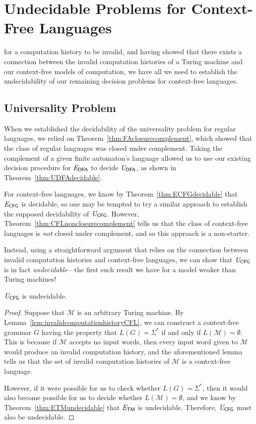 \section{Undecidable Problems for Context-Free Languages}\label{sec:undecidableproblemscontextfree}

 for a computation history to be invalid, and having showed that there exists a connection between the invalid computation histories of a Turing machine and our context-free models of computation, we have all we need to establish the undecidability of our remaining decision problems for context-free languages.

\subsection*{Universality Problem}

When we established the decidability of the universality problem for regular languages, we relied on Theorem~\ref{thm:FAclosurecomplement}, which showed that the class of regular languages was closed under complement. Taking the complement of a given finite automaton's language allowed us to use our existing decision procedure for $\mathit{E}_{\textsf{DFA}}$ to decide $\mathit{U}_{\textsf{DFA}}$, as shown in Theorem~\ref{thm:UDFAdecidable}.

For context-free languages, we know by Theorem~\ref{thm:ECFGdecidable} that $\mathit{E}_{\textsf{CFG}}$ is decidable, so one may be tempted to try a similar approach to establish the supposed decidability of $\mathit{U}_{\textsf{CFG}}$. However, Theorem~\ref{thm:CFLnonclosurecomplement} tells us that the class of context-free languages is \emph{not} closed under complement, and so this approach is a non-starter.

Instead, using a straightforward argument that relies on the connection between invalid computation histories and context-free languages, we can show that $\mathit{U}_{\textsf{CFG}}$ is in fact \emph{undecidable}---the first such result we have for a model weaker than Turing machines!

\begin{theorem}\label{thm:UCFGundecidable}
$\mathit{U}_{\textsf{CFG}}$ is undecidable.

\begin{proof}
Suppose that $\mathcal{M}$ is an arbitrary Turing machine. By Lemma~\ref{lem:invalidcomputationhistoryCFL}, we can construct a context-free grammar $G$ having the property that $L(G) = \Sigma^{*}$ if and only if $L(\mathcal{M}) = \emptyset$. This is because if $\mathcal{M}$ accepts no input words, then every input word given to $\mathcal{M}$ would produce an invalid computation history, and the aforementioned lemma tells us that the set of invalid computation histories of $\mathcal{M}$ is a context-free language.

However, if it were possible for us to check whether $L(G) = \Sigma^{*}$, then it would also become possible for us to decide whether $L(\mathcal{M}) = \emptyset$, and we know by Theorem~\ref{thm:ETMundecidable} that $\mathit{E}_{\textsf{TM}}$ is undecidable. Therefore, $\mathit{U}_{\textsf{CFG}}$ must also be undecidable.
\end{proof}
\end{theorem}

